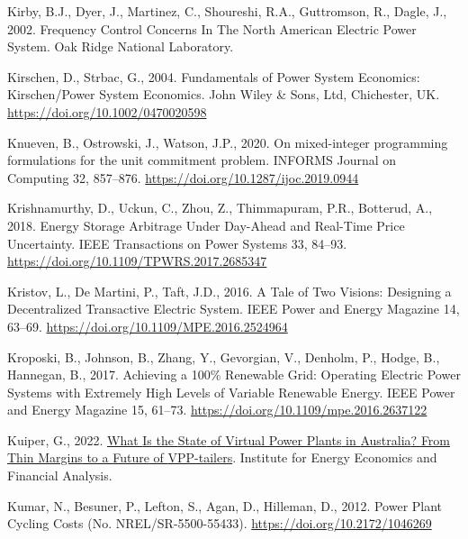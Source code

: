 \documentclass[12pt,a4paper,]{report}
\newlength{\cslhangindent}
\newenvironment{CSLReferences}[2] %
 {%
  \setlength{\parindent}{0pt}
  \ifodd #1 \everypar{\setlength{\hangindent}{\cslhangindent}}\ignorespaces\fi
  \ifnum #2 > 0
  \setlength{\parskip}{#2\baselineskip}
  \fi
 }%
 {}
\begin{document}
\begin{CSLReferences}{1}{0}
\leavevmode{}%
Kirby, B.J., Dyer, J., Martinez, C., Shoureshi, R.A., Guttromson, R.,
Dagle, J., 2002. Frequency {Control Concerns In The North American
Electric Power System}. {Oak Ridge National Laboratory}.

\leavevmode{}%
Kirschen, D., Strbac, G., 2004. Fundamentals of {Power System
Economics}: {Kirschen}/{Power System Economics}. {John Wiley \& Sons,
Ltd}, {Chichester, UK}. \url{https://doi.org/10.1002/0470020598}

\leavevmode{}%
Knueven, B., Ostrowski, J., Watson, J.P., 2020. On mixed-integer
programming formulations for the unit commitment problem. INFORMS
Journal on Computing 32, 857--876.
\url{https://doi.org/10.1287/ijoc.2019.0944}

\leavevmode{}%
Krishnamurthy, D., Uckun, C., Zhou, Z., Thimmapuram, P.R., Botterud, A.,
2018. Energy {Storage Arbitrage Under Day-Ahead} and {Real-Time Price
Uncertainty}. IEEE Transactions on Power Systems 33, 84--93.
\url{https://doi.org/10.1109/TPWRS.2017.2685347}

\leavevmode{}%
Kristov, L., De Martini, P., Taft, J.D., 2016. A {Tale} of {Two
Visions}: {Designing} a {Decentralized Transactive Electric System}.
IEEE Power and Energy Magazine 14, 63--69.
\url{https://doi.org/10.1109/MPE.2016.2524964}

\leavevmode{}%
Kroposki, B., Johnson, B., Zhang, Y., Gevorgian, V., Denholm, P., Hodge,
B., Hannegan, B., 2017. Achieving a 100\% {Renewable Grid}: {Operating
Electric Power Systems} with {Extremely High Levels} of {Variable
Renewable Energy}. IEEE Power and Energy Magazine 15, 61--73.
\url{https://doi.org/10.1109/mpe.2016.2637122}

\leavevmode{}%
Kuiper, G., 2022.
\href{https://ieefa.org/wp-content/uploads/2022/03/What-Is-the-State-of-Virtual-Power-Plants-in-Australia_March-2022_2.pdf}{What
{Is} the {State} of {Virtual Power Plants} in {Australia}? {From Thin
Margins} to a {Future} of {VPP-tailers}}. {Institute for Energy
Economics and Financial Analysis}.

\leavevmode{}%
Kumar, N., Besuner, P., Lefton, S., Agan, D., Hilleman, D., 2012. Power
{Plant Cycling Costs} (No. NREL/SR-5500-55433).
\url{https://doi.org/10.2172/1046269}


\end{CSLReferences}
\end{document}
